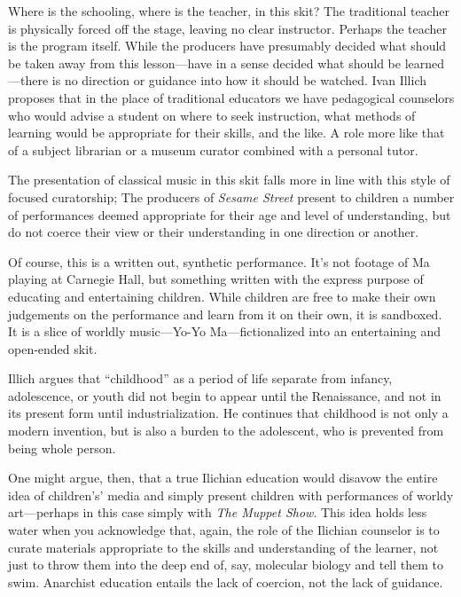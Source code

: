 \documentclass[12pt,letterpaper]{article}
\begin{document}
	Where is the schooling, where is the teacher, in this skit? The 
	traditional teacher is physically forced off the stage, leaving no clear
	instructor.  Perhaps the teacher is the program itself.  While the 
	producers have presumably decided what should be taken away from this 
	lesson---have in a sense decided what should be learned---there is no 
	direction or guidance into how it should be watched. Ivan Illich
	proposes that in the place of traditional educators we have
	pedagogical counselors who would advise a student on where to seek 
	instruction, what methods of learning would be appropriate for their 
	skills, and the like. A role more like that of a subject librarian or a 
	museum curator combined with a personal tutor.\autocite[43]{Illich}

	The presentation of classical music in this skit falls more in line with
	this style of focused curatorship; The producers of \textit{Sesame 
	Street} present to children a number of performances deemed appropriate
	for their age and level of understanding, but do not coerce their view 
	or their understanding in one direction or another.


	Of course, this is a written out, synthetic performance. It's not 
	footage of Ma playing at Carnegie Hall, but something written with the 
	express purpose of educating and entertaining children. While children 
	are free to make their own judgements on the performance and learn from
	it on their own, it is sandboxed. It is a slice of worldly music---Yo-Yo
	Ma---fictionalized into an entertaining and open-ended skit. 

	Illich argues that ``childhood'' as a period of life separate from 
	infancy, adolescence, or youth did not begin to appear until the 
	Renaissance, and not in its present form until industrialization.
	\autocite[13]{Illich} He continues that childhood is not only a modern
	invention, but is also a burden to the adolescent, who is prevented 
	from being whole person.\autocite[14]{Illich}

	One might argue, then, that a true Ilichian education would disavow the
	entire idea of children's' media and simply present children with 
	performances of worldy art---perhaps in this case simply with 
	\textit{The Muppet Show}. This idea holds less water when you 
	acknowledge that, again, the role of the Ilichian counselor is to curate
	materials appropriate to the skills and understanding of the learner, 
	not just to throw them into the deep end of, say, molecular biology 
	and tell them to swim. Anarchist education entails the lack of coercion,
	not the lack of guidance. 
\end{document}
